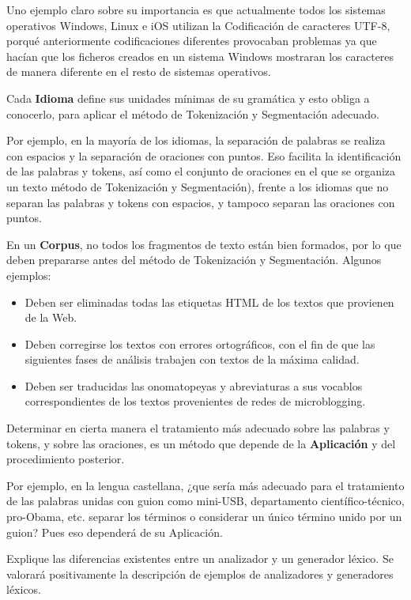 \documentclass{exam}
\begin{document}
\begin{questions}
Uno ejemplo claro sobre su importancia es que actualmente todos los sistemas operativos Windows, Linux e iOS utilizan la Codificación de caracteres UTF-8, porqué anteriormente codificaciones diferentes provocaban problemas ya que hacían que los ficheros creados en un sistema Windows mostraran los caracteres de manera diferente en el resto de sistemas operativos. 

Cada {\bf Idioma} define sus unidades mínimas de su gramática y esto obliga a conocerlo, para aplicar el método de Tokenización y Segmentación adecuado.

Por ejemplo, en la mayoría de los idiomas, la separación de palabras se realiza con espacios y la separación de oraciones con puntos. Eso facilita la identificación de las palabras y tokens, así como el conjunto de oraciones en el que se organiza un texto método de Tokenización y Segmentación), frente a los idiomas que no separan las palabras y tokens con espacios, y tampoco separan las oraciones con puntos.

En un {\bf Corpus}, no todos los fragmentos de texto están bien formados, por lo que deben prepararse antes del método de Tokenización y Segmentación. Algunos ejemplos:

\begin{itemize}
	\item Deben ser	eliminadas todas las etiquetas HTML de los textos que provienen de la Web.
	\item Deben corregirse los textos con errores ortográficos, con el fin de que las siguientes fases de análisis trabajen con textos de la máxima calidad.
	\item Deben ser traducidas las onomatopeyas y abreviaturas a sus vocablos correspondientes de los textos provenientes de redes de microblogging. 
\end{itemize}

Determinar en cierta manera el tratamiento más adecuado sobre las palabras y tokens, y sobre las oraciones, es un método que depende de la {\bf Aplicación} y del procedimiento posterior.

Por ejemplo, en la lengua castellana, ¿que sería más adecuado para el tratamiento de las palabras unidas con guion como mini-USB, departamento científico-técnico, pro-Obama, etc. separar los términos o considerar un único término unido por un guion? Pues eso dependerá de su Aplicación.

\question Explique las diferencias existentes entre un analizador y un generador léxico. Se valorará positivamente la descripción de ejemplos de analizadores y generadores léxicos. 


\end{questions}
\end{document}
